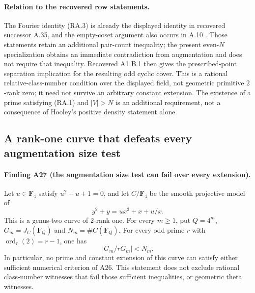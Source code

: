 \documentclass[11pt,a4paper]{article}
\begin{document}
\paragraph{Relation to the recovered row statements.}
The Fourier identity (RA.3) is already the displayed
identity in recovered successor A.35, and the empty-coset
argument also occurs in A.10 \cite[A.10 and A.35]{ASrun}.
Those statements retain an additional pair-count
inequality; the present even-$N$ specialization obtains
an immediate contradiction from augmentation and does
not require that inequality.
Recovered A1 B.1 then gives the prescribed-point
separation implication for the resulting odd cyclic cover.
This is a rational relative-class-number condition over
the displayed field, not geometric primitive $2$-rank
zero; it need not survive an arbitrary constant extension.
The existence of a prime satisfying (RA.1) and $|V|>N$
is an additional requirement, not a consequence of
Hooley's positive density statement alone.


\subsection{A rank-one curve that defeats every augmentation size test}
\label{sec:rank-one-augmentation-obstruction}

\paragraph{Finding A27 (the augmentation size test can fail over every extension).}
Let $u\in\mathbf F_4$ satisfy $u^2+u+1=0$, and let
$C/\mathbf F_4$ be the smooth projective model of
\[
                    y^2+y=ux^3+x+u/x.
\tag{RO.1}
\]
This is a genus-two curve of $2$-rank one.
For every $m\ge1$, put $Q=4^m$, $G_m=J_C(\mathbf F_Q)$
and $N_m=\#C(\mathbf F_Q)$.
For every odd prime $r$ with $\operatorname{ord}_r(2)=r-1$,
one has
\[
                         |G_m/rG_m|<N_m.
\tag{RO.2}
\]
In particular, no prime and constant extension of this
curve can satisfy either sufficient numerical criterion
of A26.  This statement does not exclude rational
class-number witnesses that fail those sufficient
inequalities, or geometric theta witnesses.
\end{document}

